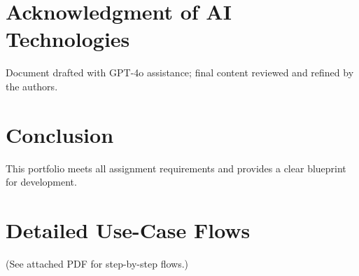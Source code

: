 \documentclass[11pt,a4paper]{article}
\begin{document}
	\section{Acknowledgment of AI Technologies}\label{sec:acknowledgment-of-ai-technologies}
	Document drafted with GPT-4o assistance; final content reviewed and refined by the authors.
	
	\section{Conclusion}\label{sec:conclusion}
	This portfolio meets all assignment requirements and provides a clear blueprint for development.
	
	\appendix
	\section{Detailed Use-Case Flows}\label{sec:usecases}
	(See attached PDF for step-by-step flows.)








	
\end{document}
